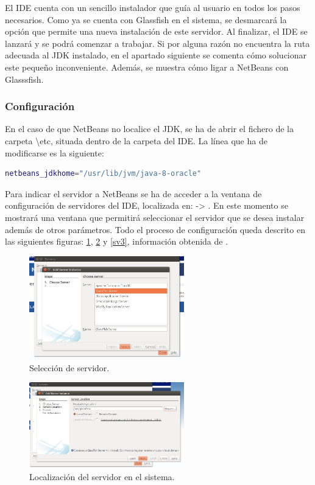 El IDE cuenta con un sencillo instalador que guía al usuario en todos los pasos necesarios. Como ya se cuenta con Glassfish en el sistema, se desmarcará la opción que permite una nueva instalación de este servidor. Al finalizar, el IDE se lanzará y se podrá comenzar a trabajar. Si por alguna razón no encuentra la ruta adecuada al JDK instalado, en el apartado siguiente se comenta cómo solucionar este pequeño inconveniente. Además, se muestra cómo ligar a NetBeans con Glasssfish.

\subsubsection{Configuración}
En el caso de que NetBeans no localice el JDK, se ha de abrir el fichero  de la carpeta \textbackslash etc, situada dentro de la carpeta del IDE. La línea que ha de modificarse es la siguiente:

\begin{lstlisting}[language=bash]
	netbeans_jdkhome="/usr/lib/jvm/java-8-oracle"
\end{lstlisting}

Para indicar el servidor a NetBeans se ha de acceder a la ventana de configuración de servidores del IDE, localizada en:  -> . En este momento se mostrará una ventana que permitirá seleccionar el servidor que se desea instalar además de otros parámetros. Todo el proceso de configuración queda descrito en las siguientes figuras:  \ref{sv1}, \ref{sv2} y \ref{sv3}, información obtenida de \cite{servnet:info}.

\begin{figure}[h]
  \centering
    \includegraphics[width=0.6\textwidth]{../img/instalacion/sv1.jpg}
  \caption{Selección de servidor.}
  \label{sv1}
\end{figure}

\begin{figure}[h]
  \centering
    \includegraphics[width=0.6\textwidth]{../img/instalacion/sv2.jpg}
  \caption{Localización del servidor en el sistema.}
  \label{sv2}
\end{figure}

